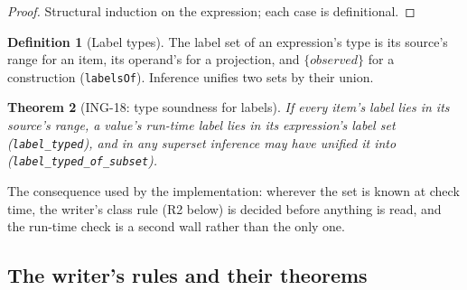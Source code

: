 \documentclass[11pt]{article}
\theoremstyle{plain}
\newtheorem{theorem}{Theorem}[section]
\theoremstyle{definition}
\newtheorem{definition}[theorem]{Definition}
\theoremstyle{remark}
\newcommand{\lean}[1]{\texttt{#1}}
\newcommand{\ing}[1]{ING-#1}
\begin{document}
\begin{proof}
Structural induction on the expression; each case is definitional.
\end{proof}

\begin{definition}[Label types]
The label set of an expression's type is its source's range for an item, its operand's for a
projection, and $\{\mathit{observed}\}$ for a construction (\lean{labelsOf}). Inference
unifies two sets by their union.
\end{definition}

\begin{theorem}[\ing{18}: type soundness for labels]
If every item's label lies in its source's range, a value's run-time label lies in its
expression's label set (\lean{label\_typed}), and in any superset inference may have unified it
into (\lean{label\_typed\_of\_subset}).
\end{theorem}

The consequence used by the implementation: wherever the set is known at check time, the
writer's class rule (R2 below) is decided before anything is read, and the run-time check is a
second wall rather than the only one.

\subsection{The writer's rules and their theorems}
\end{document}

